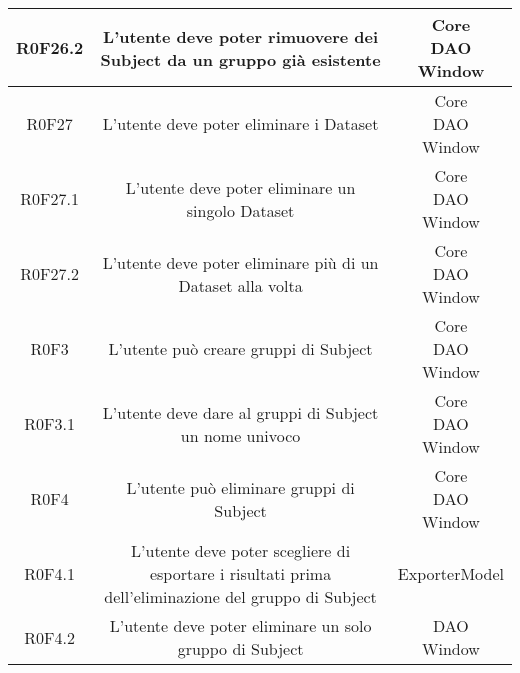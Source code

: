\begin{center}
\begin{longtable}{|c|c|c|}
\hline
R0F26.2   & \parbox[t]{\larghezza}{L'utente deve poter rimuovere dei Subject da un gruppo già esistente}  & \parbox[t]{\dimFonti}{ Core \\ DAO \\ Window \\} \\
\hline
R0F27   & \parbox[t]{\larghezza}{L'utente deve poter eliminare i Dataset}  & \parbox[t]{\dimFonti}{ Core \\ DAO \\ Window \\} \\
\hline
R0F27.1   & \parbox[t]{\larghezza}{L'utente deve poter eliminare un singolo Dataset }  & \parbox[t]{\dimFonti}{ Core \\ DAO \\ Window \\} \\
\hline
R0F27.2   & \parbox[t]{\larghezza}{L'utente deve poter eliminare più di un Dataset alla volta}  & \parbox[t]{\dimFonti}{ Core \\ DAO \\ Window \\} \\
\hline
R0F3   & \parbox[t]{\larghezza}{L'utente può creare gruppi di Subject}  & \parbox[t]{\dimFonti}{ Core \\ DAO \\ Window \\} \\
\hline
R0F3.1   & \parbox[t]{\larghezza}{L'utente deve dare al gruppi di Subject un nome univoco}  & \parbox[t]{\dimFonti}{ Core \\ DAO \\ Window \\} \\
\hline
R0F4   & \parbox[t]{\larghezza}{L'utente può eliminare gruppi di Subject}  & \parbox[t]{\dimFonti}{ Core \\ DAO \\ Window \\} \\
\hline
R0F4.1   & \parbox[t]{\larghezza}{L'utente deve poter scegliere di esportare i risultati prima dell'eliminazione del gruppo di Subject}  & \parbox[t]{\dimFonti}{ ExporterModel \\} \\
\hline
R0F4.2   & \parbox[t]{\larghezza}{L'utente deve poter eliminare un solo gruppo di Subject}  & \parbox[t]{\dimFonti}{ DAO \\ Window \\} \\

\end{longtable}
\end{center}
